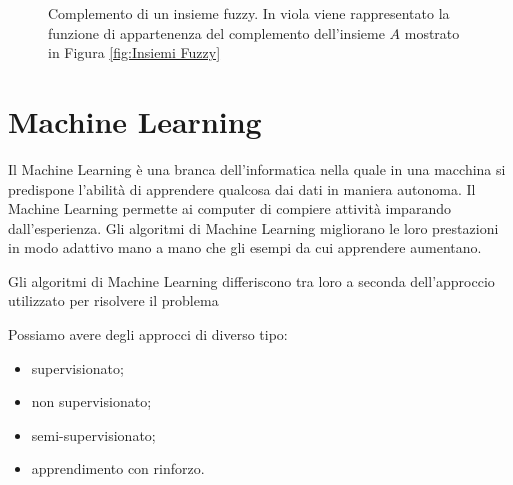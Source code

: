 \documentclass[a4paper,12pt]{report}
\begin{document}
\begin{figure}[ht]
    \centering
    \caption{Complemento di un insieme fuzzy. In viola viene rappresentato la funzione di appartenenza del complemento dell'insieme $A$ mostrato in Figura \ref{fig:Insiemi Fuzzy}} 
    \label{fig:Complemento_insieme_fuzzy}  

\end{figure}


\section{Machine Learning}
Il Machine Learning \cite{machine_learning_oreilly} è una branca dell'informatica nella quale in una macchina si predispone l'abilità di apprendere qualcosa dai dati in maniera autonoma.
Il Machine Learning permette ai computer di compiere attività imparando dall'esperienza. \newline
Gli algoritmi di Machine Learning migliorano le loro prestazioni in modo adattivo mano a mano che gli esempi da cui apprendere aumentano.

\bigskip
Gli algoritmi di Machine Learning differiscono tra loro a seconda  dell'approccio utilizzato per risolvere il problema 



Possiamo avere degli approcci di diverso tipo:
\begin{itemize}
    \item supervisionato;
    \item non supervisionato;
    \item semi-supervisionato;
    \item apprendimento con rinforzo.
\end{itemize}
\end{document}
